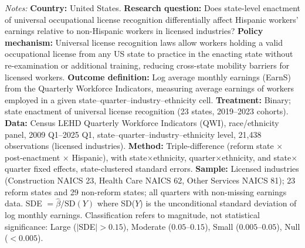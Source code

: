 \begin{table}[H]
\begin{threeparttable}
\begin{tablenotes}[flushleft]
\item \textit{Notes:} \textbf{Country:} United States. \textbf{Research question:} Does state-level enactment of universal occupational license recognition differentially affect Hispanic workers' earnings relative to non-Hispanic workers in licensed industries? \textbf{Policy mechanism:} Universal license recognition laws allow workers holding a valid occupational license from any US state to practice in the enacting state without re-examination or additional training, reducing cross-state mobility barriers for licensed workers. \textbf{Outcome definition:} Log average monthly earnings (EarnS) from the Quarterly Workforce Indicators, measuring average earnings of workers employed in a given state--quarter--industry--ethnicity cell. \textbf{Treatment:} Binary; state enactment of universal license recognition (23 states, 2019--2023 cohorts). \textbf{Data:} Census LEHD Quarterly Workforce Indicators (QWI), race/ethnicity panel, 2009 Q1--2025 Q1, state--quarter--industry--ethnicity level, 21,438 observations (licensed industries). \textbf{Method:} Triple-difference (reform state $\times$ post-enactment $\times$ Hispanic), with state$\times$ethnicity, quarter$\times$ethnicity, and state$\times$quarter fixed effects, state-clustered standard errors. \textbf{Sample:} Licensed industries (Construction NAICS 23, Health Care NAICS 62, Other Services NAICS 81); 23 reform states and 29 non-reform states; all quarters with non-missing earnings data. SDE $= \hat{\beta} / \text{SD}(Y)$ where SD($Y$) is the unconditional standard deviation of log monthly earnings. Classification refers to magnitude, not statistical significance: Large ($|$SDE$| > 0.15$), Moderate ($0.05$--$0.15$), Small ($0.005$--$0.05$), Null ($< 0.005$).
\end{tablenotes}
\end{threeparttable}
\end{table}
